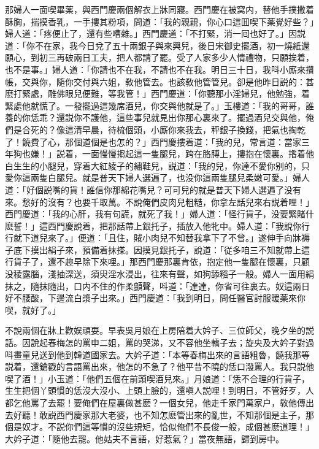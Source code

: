 那婦人一面喫畢薬，與西門慶兩個解衣上牀同寢。西門慶在被窝内，替他手撲撒着酥胸，揣摸香乳，一手摟其粉項，問道：「我的親親，你心口這囬喫下薬覺好些？」婦人道：「疼便止了，還有些嘈雜。」西門慶道：「不打緊，消一囘也好了。」因説道：「你不在家，我今日兌了五十兩銀子與來興兒，後日宋御史擺酒，初一燒紙還願心，到初三再破兩日工夫，把人都請了罷。受了人家多少人情禮物，只願挨着，也不是事。」婦人道：「你請也不在我，不請也不在我。明日三十日，我呌小廝來攢帳，交與你，隨你交付與六姐，敎他管去。也該敎他管管兒。卻是他昨日説的：甚麽打緊處，雕佛眼兒便難，等我管！」西門慶道：「你聽那小淫婦兒，他勉強，着緊處他就慌了。一發擺過這幾席酒兒，你交與他就是了。」玉樓道：「我的哥哥，誰養的你恁乖？還説你不護他，這些事兒就見出你那心裏來了。擺過酒兒交與他，俺們是合死的？像這清早晨，待梳個頭，小廝你來我去，秤銀子換錢，把氣也掏乾了！饒費了心，那個道個是也怎的？」西門慶摟着道：「我的兒，常言道：當家三年狗也嫌！」説着，一面慢慢搊起這一隻腿兒，跨在胳膊上，摟抱在懷裏。揝着他白生生的小腿兒，穿着大紅綾子的繡鞋兒，説道：「我的兒，你達不愛你别的，只愛你這兩隻白腿兒。就是普天下婦人選遍了，也没你這兩隻腿兒柔嫩可愛。」婦人道：「好個説嘴的貨！誰信你那綿花嘴兒？可可兒的就是普天下婦人選遍了没有來。愁好的沒有？也要千取萬。不說俺們皮肉兒粗糙，你拿左話兒來右説着哩！」西門慶道：「我的心肝，我有句謊，就死了我！」婦人道：「怪行貨子，没要緊賭什麽誓！」這西門慶說着，把那話帶上銀托子，插放入他牝中。婦人道：「我說你行行就下道兒來了。」便道：「且住，賊小肉兒不知替我拿下了不曾。」遂伸手向牀褥子底下摸出絹子來，預備着抹搽。因摸見銀托子，說道：「従多咱三不知就帶上這行貨子了，還不趂早除下來哩。」那西門慶那裏肯依，抱定他一隻腿在懷裏，只顧没稜露腦，淺抽深送，須臾淫水浸出，往來有聲，如狗舔糨子一般。婦人一面用絹抹之，隨抹隨出，口内不住的作柔顫聲，呌道：「達達，你省可往裏去。奴這兩日好不腰酸，下邊流白漿子出來。」西門慶道：「我到明日，問任醫官討服暖薬來你喫，就好了。」

不說兩個在牀上歡娱頑耍。早表吳月娘在上房陪着大妗子、三位師父，晚夕坐的説話。因說起春梅怎的罵申二姐，罵的哭涕，又不容他坐轎子去；旋央及大妗子對過呌畫童兒送到他到韓道國家去。大妗子道：「本等春梅出來的言語粗魯，饒我那等説着，還鎗戳的言語罵出來，他怎的不急了？他平昔不曉的恁口潑罵人。我只説他喫了酒！」小玉道：「他們五個在前頭喫酒兒來。」月娘道：「恁不合理的行貨子，生生把個丫頭慣的恁沒大沒小、上頭上臉的，還嗔人説哩！到明日，不管好歹，人都乞他罵了去罷！要俺們在屋裏做甚麽？一個女兒，他走千家門萬家户，敎他傳出去好聽！敢説西門慶家那大老婆，也不知怎麽管出來的亂世，不知那個是主子，那個是奴才。不説你們這等慣的沒些規矩，恰似俺們不長俊一般，成個甚麽道理！」大妗子道：「隨他去罷。他姑夫不言語，好惹氣？」當夜無語，歸到房中。


